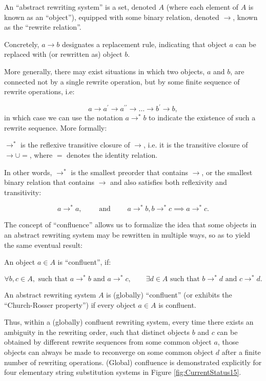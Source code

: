 \documentclass{article}
\begin{document}
\begin{definition}
An ``abstract rewriting system'' is a set, denoted $A$ (where each element of $A$ is known as an ``object''), equipped with some binary relation, denoted ${\to}$, known as the ``rewrite relation''.
\end{definition}
Concretely, ${a \to b}$ designates a replacement rule, indicating that object $a$ can be replaced with (or rewritten as) object $b$.

More generally, there may exist situations in which two objects, $a$ and $b$, are connected not by a single rewrite operation, but by some finite sequence of rewrite operations, i.e:

\begin{equation}
a \to a^{\prime} \to a^{\prime\prime} \to \dots \to b^{\prime} \to b,
\end{equation}
in  which case we can use the notation ${a \to^{*} b}$ to indicate the existence of such a rewrite sequence. More formally:

\begin{definition}
${\to^{*}}$ is the reflexive transitive closure of ${\to}$, i.e. it is the transitive closure of ${\to \cup =}$, where $=$ denotes the identity relation.
\end{definition}
In other words, ${\to^{*}}$ is the smallest preorder that contains ${\to}$, or the smallest binary relation that contains ${\to}$ and also satisfies both reflexivity and transitivity:

\begin{equation}
a \to^{*} a, \qquad \text{ and } \qquad a \to^{*} b, b \to^{*} c \implies a \to^{*} c.
\end{equation}

The concept of ``confluence'' allows us to formalize the idea that some objects in an abstract rewriting system may be rewritten in multiple ways, so as to yield the same eventual result:

\begin{definition}
An object ${a \in A}$ is ``confluent'', if:

\begin{equation}
\forall b, c \in A, \text{ such that } a \to^{*} b \text{ and } a \to^{*} c, \qquad \exists d \in A \text{ such that } b \to^{*} d \text{ and } c \to^{*} d.
\end{equation}
\end{definition}

\begin{definition}
An abstract rewriting system $A$ is (globally) ``confluent'' (or exhibits the ``Church-Rosser property'') if every object ${a \in A}$ is confluent.
\end{definition}
Thus, within a (globally) confluent rewriting system, every time there exists an ambiguity in the rewriting order, such that distinct objects $b$ and $c$ can be obtained by different rewrite sequences from some common object $a$, those objects can always be made to reconverge on some common object $d$ after a finite number of rewriting operations. (Global) confluence is demonstrated explicitly for four elementary string substitution systems in Figure \ref{fig:CurrentStatus15}.
\end{document}
